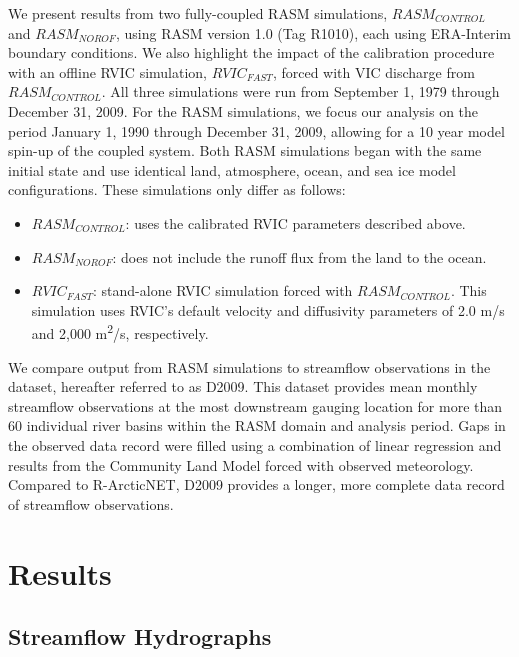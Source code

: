 \documentclass[jgrga, draft]{agutex}
\begin{document}
\begin{article}
\begin{itemize}[leftmargin=+.5in]
\begin{itemize}[leftmargin=+.5in]
We present results from two fully-coupled RASM simulations, $RASM_{CONTROL}$ and $RASM_{NOROF}$, using RASM version 1.0 (Tag R1010), each using ERA-Interim boundary conditions.
We also highlight the impact of the calibration procedure with an offline RVIC simulation, $RVIC_{FAST}$, forced with VIC discharge from $RASM_{CONTROL}$.
All three simulations were run from September 1, 1979 through December 31, 2009.
For the RASM simulations, we focus our analysis on the period January 1, 1990 through December 31, 2009, allowing for a 10 year model spin-up of the coupled system.
Both RASM simulations began with the same initial state \citep[see][]{Hamman_2016} and use identical land, atmosphere, ocean, and sea ice model configurations.
These simulations only differ as follows:
\begin{itemize}[leftmargin=+.5in]
  \item $RASM_{CONTROL}$: uses the calibrated RVIC parameters described above.
  \item $RASM_{NOROF}$: does not include the runoff flux from the land to the ocean.
  \item $RVIC_{FAST}$: stand-alone RVIC simulation forced with $RASM_{CONTROL}$. This simulation uses RVIC's default velocity and diffusivity parameters of 2.0 m/s and 2,000 m\textsuperscript{2}/s, respectively.
\end{itemize}

We compare output from RASM simulations to streamflow observations in the \citet{Dai_2009} dataset, hereafter referred to as D2009.
This dataset provides mean monthly streamflow observations at the most downstream gauging location for more than 60 individual river basins within the RASM domain and analysis period.
Gaps in the observed data record were filled using a combination of linear regression and results from the Community Land Model forced with observed meteorology.
Compared to R-ArcticNET, D2009 provides a longer, more complete data record of streamflow observations.

\section{Results}
\label{sec:results}

\subsection{Streamflow Hydrographs}
\label{sec:hydrographs}


\end{itemize}
\end{itemize}
\end{article}
\end{document}
